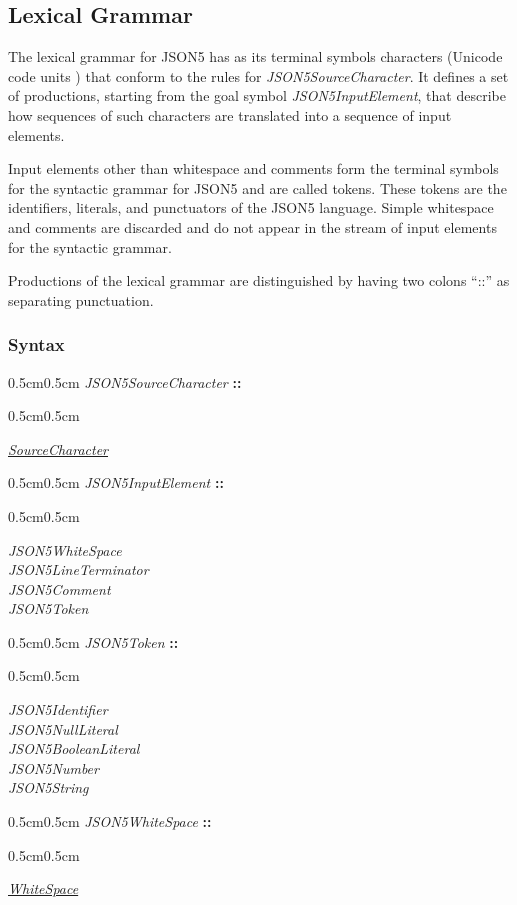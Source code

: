 \documentclass{article}
\newenvironment{gramprod}[2]{
	\begin{samepage}
	\begin{adjustwidth}{0.5cm}{0.5cm}
		\emph{#1} \textbf{#2}
		\begin{adjustwidth}{0.5cm}{0.5cm}
		}{
		\medskip
		\end{adjustwidth}
	\end{adjustwidth}
	\end{samepage}
}
\newenvironment{lexprod}[1]{
	\begin{gramprod}{#1}{::}
	}{
	\end{gramprod}
}
\newcommand{\token}[1]{\emph{#1}}
\newcommand{\lit}[1]{\textbf{\texttt{#1}}}
\newcommand{\esref}[2]{\href{http://www.ecma-international.org/ecma-262/5.1/\#sec-#2}{#1}}
\begin{document}
\subsection{Lexical Grammar}

The lexical grammar for JSON5 has as its terminal symbols characters (Unicode
code units \cite{unicode}) that conform to the rules for
\token{JSON5SourceCharacter}. It defines a set of productions, starting from the
goal symbol \token{JSON5InputElement}, that describe how sequences of such
characters are translated into a sequence of input elements.

Input elements other than whitespace and comments form the terminal symbols for
the syntactic grammar for JSON5 and are called tokens. These tokens are the
identifiers, literals, and punctuators of the JSON5 language. Simple whitespace
and comments are discarded and do not appear in the stream of input elements for
the syntactic grammar.

Productions of the lexical grammar are distinguished by having two colons ``::''
as separating punctuation.

\subsubsection*{Syntax}

\begin{lexprod}{JSON5SourceCharacter}
	\esref{\token{SourceCharacter}}{6}
\end{lexprod}

\begin{lexprod}{JSON5InputElement}
	\token{JSON5WhiteSpace}\\
	\token{JSON5LineTerminator}\\
	\token{JSON5Comment}\\
	\token{JSON5Token}
\end{lexprod}

\begin{lexprod}{JSON5Token}
	\token{JSON5Identifier}\\
	\token{JSON5NullLiteral}\\
	\token{JSON5BooleanLiteral}\\
	\token{JSON5Number}\\
	\token{JSON5String}
\end{lexprod}

\begin{lexprod}{JSON5WhiteSpace}
	\esref{\token{WhiteSpace}}{7.2}
\end{lexprod}
\end{document}
